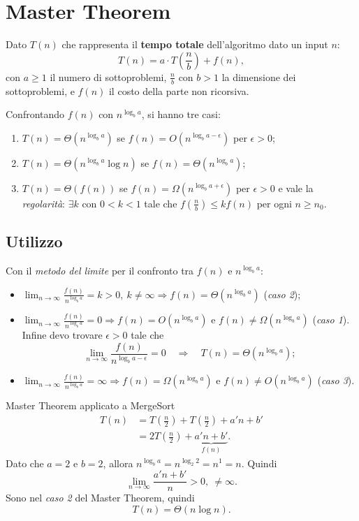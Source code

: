 \documentclass{article}
\begin{document}
\section{Master Theorem}

Dato $T(n)$ che rappresenta il \textbf{tempo totale} dell'algoritmo dato un input $n$:
\[
T(n)=a\cdot T\left(\frac{n}{b}\right)+f(n),
\]
con $a\geq1$ il numero di sottoproblemi, $\frac{n}{b}$ con $b>1$ la dimensione dei sottoproblemi, e $f(n)$ il costo della parte non ricorsiva.

Confrontando $f(n)$ con $n^{\log_b a}$, si hanno tre casi:
\begin{enumerate}
    \item $T(n)=\Theta\left(n^{\log_b a}\right)$ se $f(n)=O\left(n^{\log_b a-\epsilon}\right)$ per $\epsilon>0$;
    \item $T(n)=\Theta\left(n^{\log_b a}\log n\right)$ se $f(n)=\Theta\left(n^{\log_b a}\right)$;
    \item $T(n)=\Theta\left(f(n)\right)$ se $f(n)=\Omega\left(n^{\log_b a+\epsilon}\right)$ per $\epsilon>0$ e vale la \emph{regolarità}: $\exists k$ con $0<k<1$ tale che $f\left(\frac{n}{b}\right)\leq kf(n)$ per ogni $n\geq n_{0}$.
\end{enumerate}

\subsection{Utilizzo}

Con il \emph{metodo del limite} per il confronto tra $f(n)$ e $n^{\log_b a}$:
\begin{itemize}
    \item $\displaystyle\lim_{n\to\infty}\frac{f(n)}{n^{\log_b a}}=k>0,\ k\ne\infty \Rightarrow f(n)=\Theta(n^{\log_b a})$ (\emph{caso 2});
    \item $\displaystyle\lim_{n\to\infty}\frac{f(n)}{n^{\log_b a}}=0 \Rightarrow f(n)=O(n^{\log_b a})$ e $f(n)\ne\Omega(n^{\log_b a})$ (\emph{caso 1}).
    Infine devo trovare $\epsilon>0$ tale che
    \[
    \lim_{n\to\infty}\frac{f(n)}{n^{\log_b a-\epsilon}}=0\quad\Rightarrow\quad T(n)=\Theta(n^{\log_b a});
    \]
    \item $\displaystyle\lim_{n\to\infty}\frac{f(n)}{n^{\log_b a}}=\infty \Rightarrow f(n)=\Omega(n^{\log_b a})$ e $f(n)\ne O(n^{\log_b a})$ (\emph{caso 3}).
\end{itemize}

\begin{ex}{Master Theorem applicato a MergeSort}{}
\begin{align*}
T(n)&=T\left(\frac{n}{2}\right)+T\left(\frac{n}{2}\right)+a'n+b'\\
&=2T\left(\frac{n}{2}\right)+\underbrace{a'n+b'}_{f(n)}.
\end{align*}
Dato che $a=2$ e $b=2$, allora $n^{\log_b a}=n^{\log_2 2}=n^1=n$.
Quindi
\[
\lim_{n\to\infty}\frac{a'n+b'}{n}>0,\ \ne\infty.
\]
Sono nel \emph{caso 2} del Master Theorem, quindi
\[
T(n)=\Theta(n\log n).
\]
\end{ex}
\end{document}
